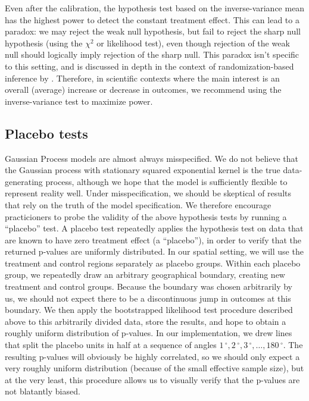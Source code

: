 \documentclass[letter]{article}
\newcommand{\degree}{{\,^\circ}}
\renewcommand{\cite}[1]{\citep{#1}}
\begin{document}
Even after the calibration, the hypothesis test based on the
inverse-variance mean has the highest power to detect the constant
treatment effect. This can lead to a paradox: we may reject the weak
null hypothesis, but fail to reject the sharp null hypothesis (using the
\(\chi^2\) or likelihood test), even though rejection of the weak null
should logically imply rejection of the sharp null. This paradox isn't
specific to this setting, and is discussed in depth in the context of
randomization-based inference by \cite{Ding:2014sf}. Therefore, in
scientific contexts where the main interest is an overall (average)
increase or decrease in outcomes, we recommend using the
inverse-variance test to maximize power.
    


    	\subsection{Placebo tests}\label{placebo-tests}
    

\label{sec:placebo}
    	Gaussian Process models are almost always misspecified. We do not
believe that the Gaussian process with stationary squared exponential
kernel is the true data-generating process, although we hope that the
model is sufficiently flexible to represent reality well. Under
misspecification, we should be skeptical of results that rely on the
truth of the model specification. We therefore encourage practicioners
to probe the validity of the above hypothesis tests by running a
``placebo'' test. A placebo test repeatedly applies the hypothesis test
on data that are known to have zero treatment effect (a ``placebo''), in
order to verify that the returned p-values are uniformly distributed. In
our spatial setting, we will use the treatment and control regions
separately as placebo groups. Within each placebo group, we repeatedly
draw an arbitrary geographical boundary, creating new treatment and
control groups. Because the boundary was chosen arbitrarily by us, we
should not expect there to be a discontinuous jump in outcomes at this
boundary. We then apply the bootstrapped likelihood test procedure
described above to this arbitrarily divided data, store the results, and
hope to obtain a roughly uniform distribution of p-values. In our
implementation, we drew lines that split the placebo units in half at a
sequence of angles \(1\degree,2\degree,3\degree,\ldots,180\degree\). The
resulting p-values will obviously be highly correlated, so we should
only expect a very roughly uniform distribution (because of the small
effective sample size), but at the very least, this procedure allows us
to visually verify that the p-values are not blatantly biased.
    
\end{document}
